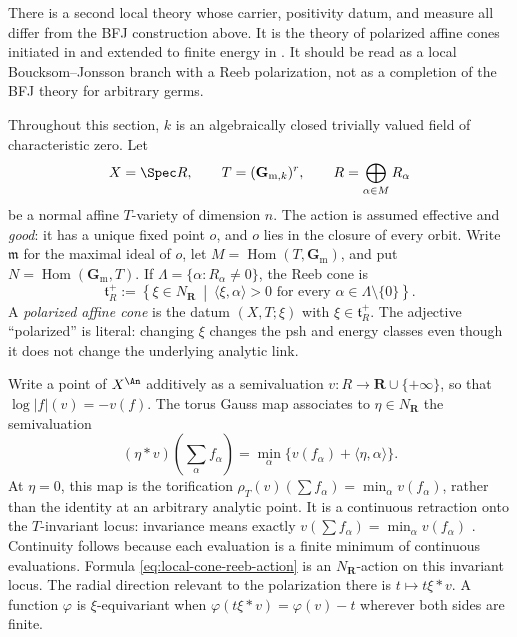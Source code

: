 There is a second local theory whose carrier, positivity datum, and measure
all differ from the BFJ construction above.  It is the theory of polarized
affine cones initiated in \cite{Wu22AffineEnergy} and extended to finite
energy in \cite{Wu24AffineCones}.  It should be read as a local
Boucksom--Jonsson branch with a Reeb polarization, not as a completion of the
BFJ theory for arbitrary germs.

Throughout this section, $k$ is an algebraically closed trivially valued
field of characteristic zero.  Let
\[
 X=\Spec R,
 \qquad
 T=(\mathbf G_{\mathrm m,k})^r,
 \qquad
 R=\bigoplus_{\alpha\in M}R_\alpha
\]
be a normal affine $T$-variety of dimension $n$.  The action is assumed
effective and \emph{good}: it has a unique fixed point $o$, and $o$ lies
in the closure of every orbit.  Write $\mathfrak m$ for the maximal ideal
of $o$, let $M=\operatorname{Hom}(T,\mathbf G_{\mathrm m})$, and put
$N=\operatorname{Hom}(\mathbf G_{\mathrm m},T)$.  If
$\Lambda=\{\alpha:R_\alpha\ne0\}$, the Reeb cone is
\[
 \mathfrak t^+_R
 :=\left\{\xi\in N_{\mathbf R}\ \middle|\
       \langle\xi,\alpha\rangle>0
       \text{ for every }\alpha\in\Lambda\setminus\{0\}\right\}.
\tag{70.56}\label{eq:local-cone-reeb-cone}
\]
A \emph{polarized affine cone} is the datum $(X,T;\xi)$ with
$\xi\in\mathfrak t^+_R$.  The adjective ``polarized'' is literal: changing
$\xi$ changes the psh and energy classes even though it does not change
the underlying analytic link.

Write a point of $X^{\An}$ additively as a semivaluation
$v:R\to\mathbf R\cup\{+\infty\}$, so that
$\log|f|(v)=-v(f)$.  The torus Gauss map associates to
$\eta\in N_{\mathbf R}$ the semivaluation
\[
 (\eta*v)\!\left(\sum_\alpha f_\alpha\right)
  =\min_\alpha\bigl\{v(f_\alpha)
                  +\langle\eta,\alpha\rangle\bigr\}.
\tag{70.57}\label{eq:local-cone-reeb-action}
\]
At $\eta=0$, this map is the torification
$\rho_T(v)(\sum f_\alpha)=\min_\alpha v(f_\alpha)$, rather than the
identity at an arbitrary analytic point.  It is a continuous retraction
onto the $T$-invariant locus: invariance means exactly
$v(\sum f_\alpha)=\min_\alpha v(f_\alpha)$
\cite[Section~2.2]{Wu24AffineCones}.  Continuity follows because each
evaluation is a finite minimum of continuous evaluations.  Formula
\eqref{eq:local-cone-reeb-action} is an $N_{\mathbf R}$-action on this
invariant locus.  The radial direction relevant to the polarization there
is $t\mapsto t\xi*v$.
A function $\varphi$ is $\xi$-equivariant when
$\varphi(t\xi*v)=\varphi(v)-t$ wherever both sides are finite.

